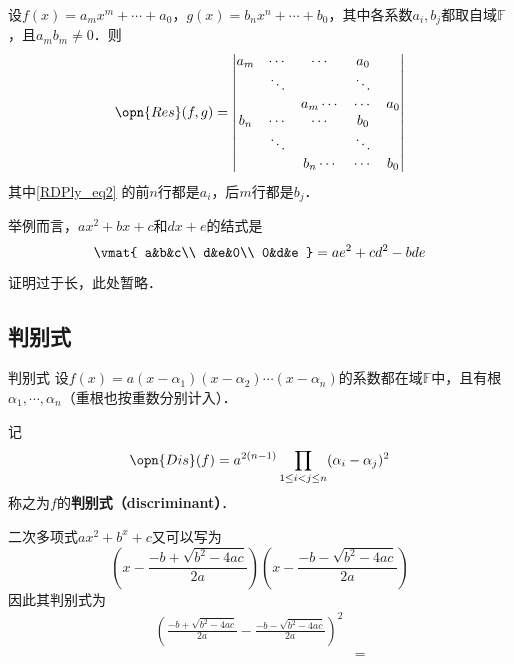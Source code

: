 \begin{theorem}{}
设$f(x)=a_mx^m+\cdots+a_0$，$g(x)=b_nx^n+\cdots+b_0$，其中各系数$a_i, b_j$都取自域$\mathbb{F}$，且$a_mb_m\neq 0$．则
\begin{equation}\label{RDPly_eq2}
\opn{Res}(f, g)=
\begin{vmatrix}
a_m&\cdots&\cdots&a_0\\
&\ddots& & \ddots\\
&&a_m\cdots&\cdots&a_0\\
b_n&\cdots&\cdots&b_0\\
&\ddots& & \ddots\\
&&b_n\cdots&\cdots&b_0\\
\end{vmatrix}
\end{equation}
其中\autoref{RDPly_eq2} 的前$n$行都是$a_i$，后$m$行都是$b_j$．

举例而言，$ax^2+bx+c$和$dx+e$的结式是
\begin{equation}
\vmat{
    a&b&c\\
    d&e&0\\
    0&d&e
}
=
ae^2+cd^2-bde
\end{equation}

\end{theorem}

证明过于长，此处暂略．



\subsection{判别式}

\begin{definition}{判别式}
设$f(x)=a(x-\alpha_1)(x-\alpha_2)\cdots(x-\alpha_n)$的系数都在域$\mathbb{F}$中，且有根$\alpha_1, \cdots, \alpha_n$（重根也按重数分别计入）．

记
\begin{equation}
\opn{Dis}(f) = a^{2(n-1)}\prod_{1\leq i<j\leq n}(\alpha_i-\alpha_j)^2
\end{equation}
称之为$f$的\textbf{判别式（discriminant）}．
\end{definition}

\begin{example}{}
二次多项式$ax^2+b^x+c$又可以写为
\begin{equation}
(x-\frac{-b+\sqrt{b^2-4ac}}{2a})(x-\frac{-b-\sqrt{b^2-4ac}}{2a})
\end{equation}
因此其判别式为
\begin{equation}
\begin{aligned}
(\frac{-b+\sqrt{b^2-4ac}}{2a}-\frac{-b-\sqrt{b^2-4ac}}{2a})^2\\
&=
\end{aligned}
\end{equation}
\end{example}
















